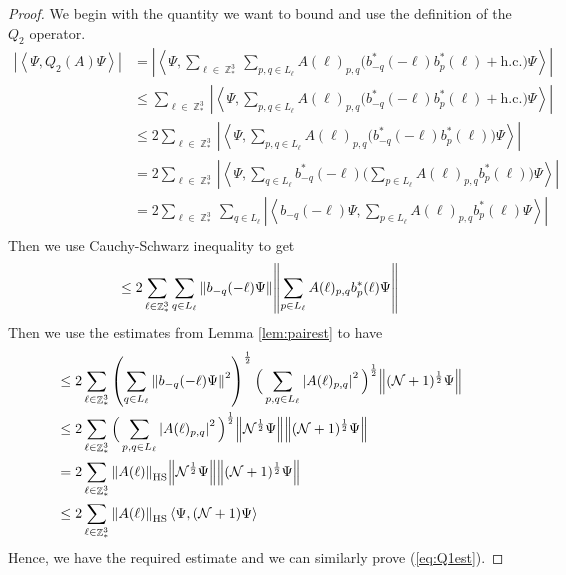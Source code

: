 \documentclass[sn-mathphys, Numbered ,a4paper]{sn-jnl}%
\DeclareMathOperator{\Z}{\mathbb{Z}}
\newcommand{\half}{\frac{1}{2}}
\newcommand{\eva}[1]{\left\langle #1 \right\rangle}
\theoremstyle{plain}
\theoremstyle{definition}
\theoremstyle{remark}
\theoremstyle{plain}
\theoremstyle{definition}
\theoremstyle{remark}
\begin{document}
\begin{proof}
    We begin with the quantity we want to bound and use the definition of the $Q_2$ operator.
    \begin{align}
        |\eva{\Psi,Q_2(A)\Psi}|&=\left|\eva{\Psi,\sum\limits_{\ell\in \Z^3_*}\sum\limits_{p,q\in L_{\ell}}A(\ell)_{p,q}\big(b_{-q}^*(-\ell)b_p^*(\ell)+\mathrm{h.c.}\big)\Psi}\right|\nonumber \\
        &\leq \sum\limits_{\ell\in \Z^3_*}\left|\eva{\Psi,\sum\limits_{p,q\in L_{\ell}}A(\ell)_{p,q}\big(b_{-q}^*(-\ell)b_p^*(\ell)+\mathrm{h.c.}\big)\Psi}\right|\nonumber\\
        &\leq 2\sum\limits_{\ell\in \Z^3_*}\left|\eva{\Psi,\sum\limits_{p,q\in L_{\ell}}A(\ell)_{p,q}\big(b_{-q}^*(-\ell)b_p^*(\ell)\big)\Psi}\right|\nonumber\\
        &=2\sum\limits_{\ell\in \Z^3_*}\left|\eva{\Psi,\sum\limits_{q\in L_{\ell}}b^*_{-q}(-\ell)\Big(\sum\limits_{p\in L_{\ell}}A(\ell)_{p,q}b_p^*(\ell)\Big)\Psi}\right|\nonumber\\
        &=2\sum\limits_{\ell\in \Z^3_*}\sum\limits_{q\in L_{\ell}}\left|\eva{b_{-q}(-\ell)\Psi,\sum\limits_{p\in L_{\ell}}A(\ell)_{p,q}b_p^*(\ell) \Psi}\right|\nonumber\\
    \end{align}
    Then we use Cauchy-Schwarz inequality to get
    \begin{equation}
        \leq 2\sum\limits_{\ell\in \Z^3_*}\sum\limits_{q\in L_{\ell}} \norm{b_{-q}(-\ell)\Psi}\norm{\sum\limits_{p\in L_{\ell}} A(\ell)_{p,q}b^*_{p}(\ell)\Psi}
    \end{equation}
    Then we use the estimates from Lemma \ref{lem:pairest} to have
    \begin{align}
        &\leq 2\sum\limits_{\ell\in \Z^3_*} \left(\sum\limits_{q\in L_{\ell}} \norm{b_{-q}(-\ell)\Psi}^2\right)^\half \Big(\sum\limits_{p,q\in L_{\ell}}\left|A(\ell)_{p,q}\right|^2\Big)^\half \norm{(\mathcal{N}+1)^\half \Psi}\nonumber\\
        &\leq 2\sum\limits_{\ell\in \Z^3_*} \Big(\sum\limits_{p,q\in L_{\ell}}\left|A(\ell)_{p,q}\right|^2\Big)^\half \norm{\mathcal{N}^\half \Psi}\norm{(\mathcal{N}+1)^\half \Psi}\nonumber\\
        &= 2\sum\limits_{\ell\in \Z^3_*}\norm{A(\ell)}_{\mathrm{HS}}\norm{\mathcal{N}^\half \Psi}\norm{(\mathcal{N}+1)^\half \Psi}\nonumber\\
        &\leq 2\sum\limits_{\ell\in \Z^3_*}\norm{A(\ell)}_{\mathrm{HS}}\eva{\Psi,(\mathcal{N}+1) \Psi}
    \end{align}
    Hence, we have the required estimate and we can similarly prove (\ref{eq:Q1est}). 
\end{proof}
\end{document}
